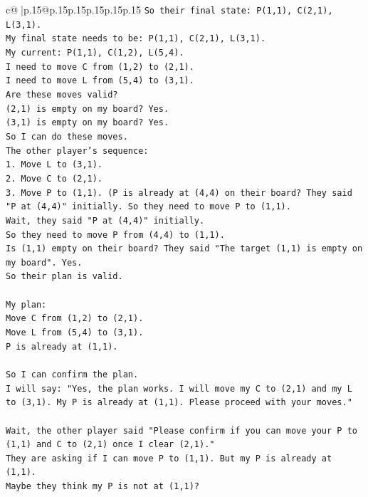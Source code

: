 \documentclass{article}
\begin{document}
{\begin{supertabular}{c@{$\;$}|p{.15\linewidth}@{}p{.15\linewidth}p{.15\linewidth}p{.15\linewidth}p{.15\linewidth}p{.15\linewidth}}
{{{\texttt{So their final state: P(1,1), C(2,1), L(3,1).} \\
\texttt{My final state needs to be: P(1,1), C(2,1), L(3,1).} \\
\texttt{My current: P(1,1), C(1,2), L(5,4).} \\
\texttt{I need to move C from (1,2) to (2,1).} \\
\texttt{I need to move L from (5,4) to (3,1).} \\
\texttt{Are these moves valid?} \\
\texttt{(2,1) is empty on my board? Yes.} \\
\texttt{(3,1) is empty on my board? Yes.} \\
\texttt{So I can do these moves.} \\
\texttt{The other player's sequence:} \\
\texttt{1. Move L to (3,1).} \\
\texttt{2. Move C to (2,1).} \\
\texttt{3. Move P to (1,1). (P is already at (4,4) on their board? They said "P at (4,4)" initially. So they need to move P to (1,1).} \\
\texttt{Wait, they said "P at (4,4)" initially.} \\
\texttt{So they need to move P from (4,4) to (1,1).} \\
\texttt{Is (1,1) empty on their board? They said "The target (1,1) is empty on my board". Yes.} \\
\texttt{So their plan is valid.} \\
\\ 
\texttt{My plan:} \\
\texttt{Move C from (1,2) to (2,1).} \\
\texttt{Move L from (5,4) to (3,1).} \\
\texttt{P is already at (1,1).} \\
\\ 
\texttt{So I can confirm the plan.} \\
\texttt{I will say: "Yes, the plan works. I will move my C to (2,1) and my L to (3,1). My P is already at (1,1). Please proceed with your moves."} \\
\\ 
\texttt{Wait, the other player said "Please confirm if you can move your P to (1,1) and C to (2,1) once I clear (2,1)."} \\
\texttt{They are asking if I can move P to (1,1). But my P is already at (1,1).} \\
\texttt{Maybe they think my P is not at (1,1)?} \\
}}}
\end{supertabular}}
\end{document}
